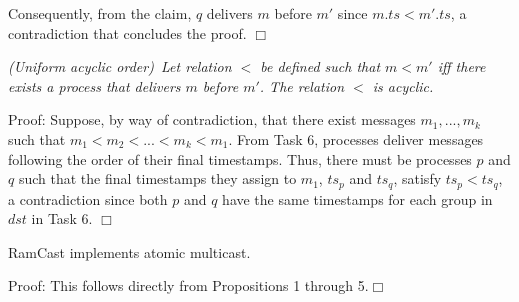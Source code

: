 
Consequently, from the claim, $q$ delivers $m$ before $m'$ since $m.ts < m'.ts$, a contradiction that concludes the proof.
\hfill$\Box$

\vspace{2mm}
\begin{proposition}
\textit{(Uniform acyclic order)~Let relation $<$ be defined such that $m < m'$ iff there exists a process that delivers $m$ before $m'$.  The relation $<$ is acyclic.}
\end{proposition}
\vspace{2mm}
\noindent
{\sc Proof:} 
Suppose, by way of contradiction, that there exist messages $m_1, ..., m_k$ such that $m_1 < m_2 < ... < m_k < m_1$. 
From Task 6, processes deliver messages following the order of their final timestamps.
Thus, there must be processes $p$ and $q$ such that the final timestamps they assign to $m_1$, $ts_p$ and  $ts_q$, satisfy $ts_p < ts_q$, a contradiction since both $p$ and $q$ have the same timestamps for each group in $dst$ in Task 6.
\hfill$\Box$

\vspace{2mm}
\begin{theorem}
RamCast implements atomic multicast.
\end{theorem}
\vspace{2mm}
\noindent
{\sc Proof:} 
This follows directly from Propositions 1 through 5.\hfill$\Box$

